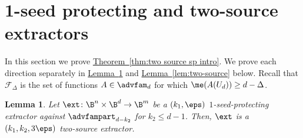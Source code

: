\documentclass[11pt]{article}
\numberwithin{equation}{section}
\newtheorem{lemma}[theorem]{Lemma}
\theoremstyle{definition}
\theoremstyle{plain}
\newcommand{\expref}[2]{\hyperref[#2]{#1~\ref{#2}}}
\begin{document}
\section{1-seed protecting and two-source extractors}\label{sec:two source}

In this section we prove \expref{Theorem}{thm:two source sp intro}. We prove each direction separately in \expref{Lemma}{lem: sp is ts} and \expref{Lemma}{lem:two-source} below. Recall that $\mathcal{F}_{\Delta}$ is the set of functions $A \in \advfam_d$ for which $\me(A(U_d)) \ge d-\Delta$.

\begin{lemma}\label{lem: sp is ts}
Let  $\ext \colon \B^{n} \times \B^{d} \rightarrow \B^{m}$ be a $(k_1,\eps)$ $1$-seed-protecting extractor against $\advfampart_{d-k_2}$ for $k_2\leq d-1$. Then, $\ext$ is a $(k_1,k_2, 3\eps)$ two-source extractor.
\end{lemma}
%
\end{document}
